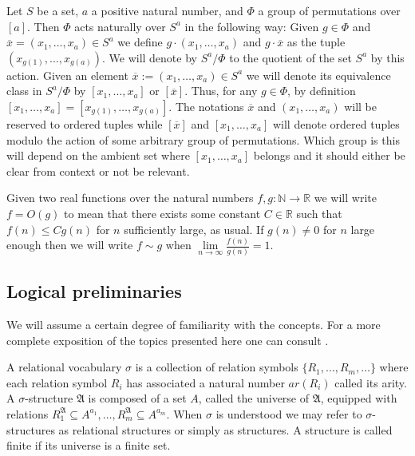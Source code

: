 \documentclass[12pt,notitlepage,a4paper]{article}
\theoremstyle{definition}
\newcommand{\R}{\mathbb{R}}
\newcommand{\N}{\mathbb{N}}
\newcommand{\Ln}{\lim\limits_{n\to \infty}}
\begin{document}
Let $S$ be a set, $a$ a positive natural number, 
and $\Phi$ a group of permutations over 
$[a]$. Then $\Phi$ acts naturally over
$S^a$ in the following way: Given $g\in \Phi$ and
$\overline{x}=(x_1,\dots,x_a)\in S^a$ we define 
$g\cdot(x_1,\dots,x_a)$ and $g\cdot \overline{x}$ 
as the tuple $(x_{g(1)},\dots,x_{g(a)})$. 
We will denote by $S^a/\Phi$ to the quotient
of the set $S^a$ by this action. Given an element
$\overline{x}:=(x_1,\dots, x_a)\in S^a$ we will denote its equivalence
class in $S^a/\Phi$ by $[x_1,\dots,x_a]$ or $[\overline{x}]$.
Thus, for any
$g\in \Phi$, by definition $[x_1,\dots,x_a]=[x_{g(1)}
,\dots,x_{g(a)}]$. The notations $\overline{x}$ and
$(x_1,\dots, x_a)$ 
will be reserved 
to ordered tuples while 
$[\overline{x}]$ and
$[x_1,\dots,x_a]$ will denote ordered tuples modulo the
action of some arbitrary group of permutations. Which group is
this will depend on the ambient set where $[x_1,\dots,x_a]$ belongs
and it should either be clear from context or not be relevant.\par
\par
Given two real functions over the natural numbers 
$f,g:\N \rightarrow \R$ we will write $f=O(g)$ to 
mean that there exists some constant $C\in \R$
such that $f(n)\leq Cg(n)$ for $n$ sufficiently large, 
as usual.
If $g(n)\neq 0$ for $n$ large enough then
we will write $f\sim g$ when $\Ln \frac{f(n)}{g(n)}=1$.\par





\subsection{Logical preliminaries}
We will assume a certain degree of familiarity with the 
concepts. For a more complete exposition of the topics 
presented here one can consult \cite{ebbinghaus2013mathematical}.

A relational vocabulary $\sigma$ is a collection of
relation symbols $\{R_1,\dots, R_m,\dots\}$
where each relation symbol $R_i$ has associated a natural
number $ar(R_i)$ called its arity.
A $\sigma$-structure $\mathfrak{A}$ is composed of
a set $A$, called the universe of $\mathfrak{A}$, equipped with
relations $R_1^{\mathfrak{A}}\subseteq A^{a_1},
\dots, R_m^{\mathfrak{A}}\subseteq A^{a_m}$. When $\sigma$
is understood we may refer to $\sigma$-structures as relational
structures or simply as structures.
A structure is called finite if its universe is a finite set. \par
\end{document}
